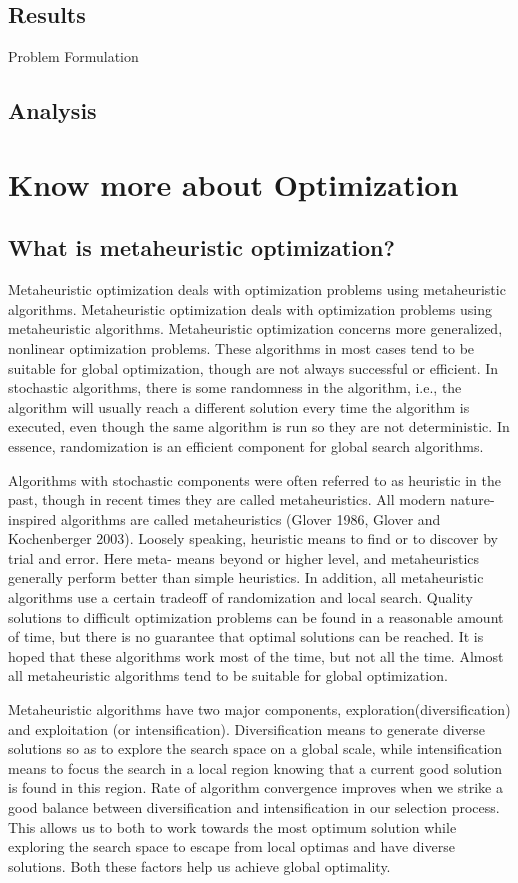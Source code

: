 \documentclass[a4paper]{article}
\begin{document}
\subsection{Results}
Problem Formulation
\subsection{Analysis}
\section{Know more about Optimization}
\subsection{What is metaheuristic optimization?}
\par Metaheuristic optimization 
deals with optimization problems using metaheuristic algorithms.
Metaheuristic optimization deals with optimization problems using metaheuristic algorithms. Metaheuristic optimization concerns more generalized, nonlinear optimization problems. These algorithms in most cases tend to be suitable for global
optimization, though are not always successful or efficient.
In stochastic algorithms, there is some randomness in the algorithm, i.e., the algorithm will usually reach a different solution every time the algorithm is executed, even though the same algorithm is run so they are not deterministic. In essence, randomization is an efficient component for global search algorithms.
\par Algorithms with stochastic components were often referred to as heuristic in the past, though in recent times they are called metaheuristics. All modern nature-inspired algorithms are called metaheuristics (Glover 1986, Glover and Kochenberger 2003). Loosely speaking, heuristic means to find or to discover by trial and error. Here meta- means beyond or higher level, and metaheuristics generally perform better than simple heuristics. In addition, all metaheuristic algorithms use a certain tradeoff of randomization and local search. Quality solutions to difficult optimization problems can be found in a reasonable amount of time, but there is no guarantee that optimal solutions can be reached. 
It is hoped that these algorithms work most of the time, but not all the time. Almost all metaheuristic algorithms tend to be suitable for global optimization.
\par Metaheuristic algorithms have two major components, exploration(diversification) and exploitation (or intensification). Diversification means to generate diverse
 solutions so as to explore the search space on a global scale, while intensification means to focus the search in a local region knowing that a current good solution
  is found in this region. Rate of algorithm convergence improves when we strike a good balance between diversification and intensification in our selection process. This allows us to both to work towards the most optimum solution while exploring the search space to escape from local optimas and have diverse solutions. Both these factors help us achieve global optimality.
\end{document}
